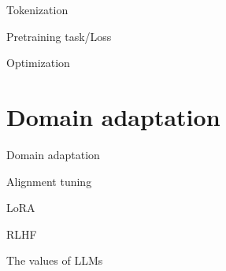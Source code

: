 \documentclass[10pt]{beamer}
\begin{document}
\begin{frame}{Tokenization}


\end{frame}

\begin{frame}{Pretraining task/Loss}


\end{frame}

\begin{frame}{Optimization}




\end{frame}



\section{Domain adaptation}

\begin{frame}{Domain adaptation}



\end{frame}


\begin{frame}{Alignment tuning}




\end{frame}

\begin{frame}{LoRA}


\end{frame}


\begin{frame}{RLHF}


\end{frame}

\begin{frame}{The values of LLMs}


\end{frame}
\end{document}
